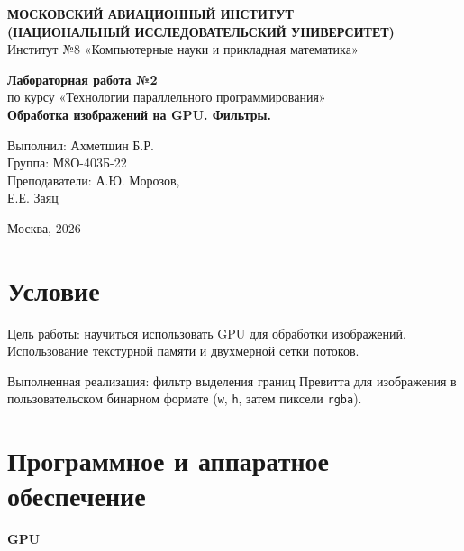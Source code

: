 \documentclass[a4paper,14pt]{extarticle}
\begin{document}
\begin{titlepage}
    \begin{center}
        \textbf{МОСКОВСКИЙ АВИАЦИОННЫЙ ИНСТИТУТ}\\
        \textbf{(НАЦИОНАЛЬНЫЙ ИССЛЕДОВАТЕЛЬСКИЙ УНИВЕРСИТЕТ)}\\
        Институт №8 «Компьютерные науки и прикладная математика»
    \end{center}

    \vspace{3.5cm}

    \begin{center}
        \textbf{\Large Лабораторная работа №2}\\
        \vspace{0.3cm}
        по курсу «Технологии параллельного программирования»\\
        \vspace{0.8cm}
        \textbf{Обработка изображений на GPU. Фильтры.}
    \end{center}

    \vspace{4cm}

    \begin{flushright}
        Выполнил: Ахметшин Б.Р.\\
        Группа: М8О-403Б-22\\
        Преподаватели: А.Ю. Морозов,\\
        \hspace*{3.6cm} Е.Е. Заяц
    \end{flushright}

    \vfill

    \begin{center}
        Москва, 2026
    \end{center}
\end{titlepage}

\section*{Условие}
Цель работы: научиться использовать GPU для обработки изображений.
Использование текстурной памяти и двухмерной сетки потоков.

Выполненная реализация: фильтр выделения границ Превитта для изображения
в пользовательском бинарном формате (\texttt{w}, \texttt{h}, затем пиксели \texttt{rgba}).

\section*{Программное и аппаратное обеспечение}
\textbf{GPU}
\end{document}
